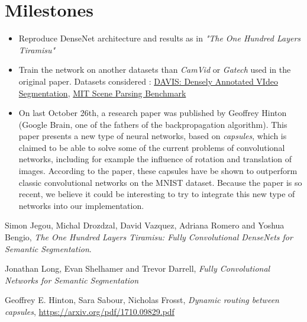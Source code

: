 \documentclass[a4,12pt]{article}
\begin{document}
	\section{Milestones}
	\begin{itemize}
		\item Reproduce DenseNet architecture and results as in \textit{"The One Hundred Layers Tiramisu"} \cite{tiramisu}
		\item Train the network on another datasets than \textit{CamVid} or \textit{Gatech} used in the original paper. Datasets considered : \href{http://davischallenge.org/}{DAVIS: Densely Annotated VIdeo Segmentation}, \href{http://sceneparsing.csail.mit.edu/}{MIT Scene Parsing Benchmark}
		\item On last October 26th, a research paper \cite{capsules-paper} was published by Geoffrey Hinton (Google Brain, one of the fathers of the backpropagation algorithm). This paper presents a new type of neural networks, based on \textit{capsules}, which is claimed to be able to solve some of the current problems of convolutional networks, including for example the influence of rotation and translation of images. According to the paper, these capsules have be shown to outperform classic convolutional networks on the MNIST dataset. Because the paper is so recent, we believe it could be interesting to try to integrate this new type of networks into our implementation. 
	\end{itemize}
	
	\begin{thebibliography}{3}
		
		Simon Jegou, Michal Drozdzal, David Vazquez, Adriana Romero and Yoshua Bengio,
		\textit{The One Hundred Layers Tiramisu: Fully Convolutional DenseNets for Semantic Segmentation}.
		
		Jonathan Long, Evan Shelhamer and Trevor Darrell,
		\textit{Fully Convolutional Networks for Semantic Segmentation}
		
		Geoffrey E. Hinton, Sara Sabour, Nicholas Frosst,
		\textit{Dynamic routing between capsules},
		\url{https://arxiv.org/pdf/1710.09829.pdf}
		
	\end{thebibliography}
\end{document}

